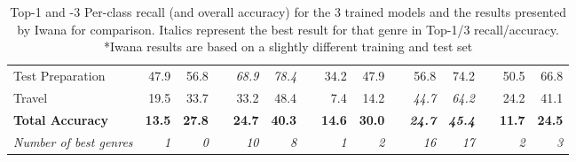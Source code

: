 \documentclass[12pt]{article}
\numberwithin{equation}{section}
\numberwithin{figure}{section}
\begin{document}
\begin{table}[]
{\begin{tabular}{lrrrrrrrrrrrrrr}
	Test Preparation               & 47.9                               & 56.8                               &                               & \textit{68.9}                      & \textit{78.4}                      &                               & 34.2                               & 47.9                               &                               & 56.8                               & 74.2                               &                               & 50.5                               & 66.8                               \\
	Travel                         & 19.5                               & 33.7                               &                               & 33.2                               & 48.4                               &                               & 7.4                                & 14.2                               &                               & \textit{44.7}                      & \textit{64.2}                      &                               & 24.2                               & 41.1                               \\ \hline
	\textbf{Total Accuracy}         & \textbf{13.5}                      & \textbf{27.8}                      & \textbf{}                     & \textbf{24.7}                      & \textbf{40.3}                      & \textbf{}                     & \textbf{14.6}                      & \textbf{30.0}                      &                               & \textit{\textbf{24.7}}             & \textit{\textbf{45.4}}             &                               & \textbf{11.7}                      & \textbf{24.5}                      \\ \hline
	\textit{Number of best genres} & \textit{1}                         & \textit{0}                         & \textit{}                     & \textit{10}                        & \textit{8}                         & \textit{}                     & \textit{1}                         & \textit{2}                         & \textit{}                     & \textit{16}                        & \textit{17}                        & \textit{}                     & \textit{2}                         & \textit{3}                        
	\end{tabular}%
	}
	\caption{Top-1 and -3 Per-class recall (and overall accuracy) for the 3 trained models and the results presented by Iwana for comparison. Italics represent the best result for that genre in Top-1/3 recall/accuracy. \\
	\tiny{*Iwana results are based on a slightly different training and test set}
	}
	\label{tab:results_acc}
	\end{table}
\end{document}
